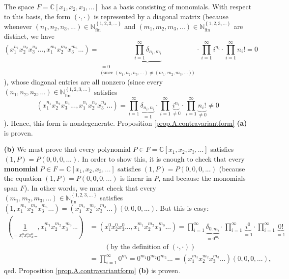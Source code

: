 \documentclass[etingof-lie.tex]{subfiles}
\begin{document}
The space $F=\mathbb{C}\left[  x_{1},x_{2},x_{3},...\right]  $ has a basis
consisting of monomials. With respect to this basis, the form $\left(
\cdot,\cdot\right)  $ is represented by a diagonal matrix (because whenever
$\left(  n_{1},n_{2},n_{3},...\right)  \in\mathbb{N}_{\operatorname*{fin}%
}^{\left\{  1,2,3,...\right\}  }$ and $\left(  m_{1},m_{2},m_{3},...\right)
\in\mathbb{N}_{\operatorname*{fin}}^{\left\{  1,2,3,...\right\}  }$ are
distinct, we have
\[
\left(  x_{1}^{n_{1}}x_{2}^{n_{2}}x_{3}^{n_{3}}...,x_{1}^{m_{1}}x_{2}^{m_{2}%
}x_{3}^{m_{3}}...\right)  =\underbrace{\prod\limits_{i=1}^{\infty}%
\delta_{n_{i},m_{i}}}_{\substack{=0\\\text{(since }\left(  n_{1},n_{2}%
,n_{3},...\right)  \neq\left(  m_{1},m_{2},m_{3},...\right)  \text{)}}%
}\cdot\prod\limits_{i=1}^{\infty}i^{n_{i}}\cdot\prod\limits_{i=1}^{\infty
}n_{i}!=0
\]
), whose diagonal entries are all nonzero (since every $\left(  n_{1}%
,n_{2},n_{3},...\right)  \in\mathbb{N}_{\operatorname*{fin}}^{\left\{
1,2,3,...\right\}  }$ satisfies%
\[
\left(  x_{1}^{n_{1}}x_{2}^{n_{2}}x_{3}^{n_{3}}...,x_{1}^{n_{1}}x_{2}^{n_{2}%
}x_{3}^{n_{3}}...\right)  =\prod\limits_{i=1}^{\infty}\underbrace{\delta
_{n_{i},n_{i}}}_{=1}\cdot\prod\limits_{i=1}^{\infty}\underbrace{i^{n_{i}}%
}_{\neq0}\cdot\prod\limits_{i=1}^{\infty}\underbrace{n_{i}!}_{\neq0}\neq0
\]
). Hence, this form is nondegenerate. Proposition
\ref{prop.A.contravariantform} \textbf{(a)} is proven.

\textbf{(b)} We must prove that every polynomial $P\in F=\mathbb{C}\left[
x_{1},x_{2},x_{3},...\right]  $ satisfies $\left(  1,P\right)  =P\left(
0,0,0,...\right)  $. In order to show this, it is enough to check that every
\textbf{monomial} $P\in F=\mathbb{C}\left[  x_{1},x_{2},x_{3},...\right]  $
satisfies $\left(  1,P\right)  =P\left(  0,0,0,...\right)  $ (because the
equation $\left(  1,P\right)  =P\left(  0,0,0,...\right)  $ is linear in $P$,
and because the monomials span $F$). In other words, we must check that every
$\left(  m_{1},m_{2},m_{3},...\right)  \in\mathbb{N}_{\operatorname*{fin}%
}^{\left\{  1,2,3,...\right\}  }$ satisfies $\left(  1,x_{1}^{m_{1}}%
x_{2}^{m_{2}}x_{3}^{m_{3}}...\right)  =\left(  x_{1}^{m_{1}}x_{2}^{m_{2}}%
x_{3}^{m_{3}}...\right)  \left(  0,0,0,...\right)  $. But this is easy:%
\begin{align*}
\left(  \underbrace{1}_{=x_{1}^{0}x_{2}^{0}x_{3}^{0}...},x_{1}^{m_{1}}%
x_{2}^{m_{2}}x_{3}^{m_{3}}...\right)   &  =\left(  x_{1}^{0}x_{2}^{0}x_{3}%
^{0}...,x_{1}^{m_{1}}x_{2}^{m_{2}}x_{3}^{m_{3}}...\right)  =\prod
\limits_{i=1}^{\infty}\underbrace{\delta_{0,m_{i}}}_{=0^{m_{i}}}\cdot
\prod\limits_{i=1}^{\infty}\underbrace{i^{0}}_{=1}\cdot\prod\limits_{i=1}%
^{\infty}\underbrace{0!}_{=1}\\
&  \ \ \ \ \ \ \ \ \ \ \left(  \text{by the definition of }\left(  \cdot
,\cdot\right)  \right) \\
&  =\prod\limits_{i=1}^{\infty}0^{m_{i}}=0^{m_{1}}0^{m_{2}}0^{m_{3}%
}...=\left(  x_{1}^{m_{1}}x_{2}^{m_{2}}x_{3}^{m_{3}}...\right)  \left(
0,0,0,...\right)  ,
\end{align*}
qed. Proposition \ref{prop.A.contravariantform} \textbf{(b)} is proven.
\end{document}
